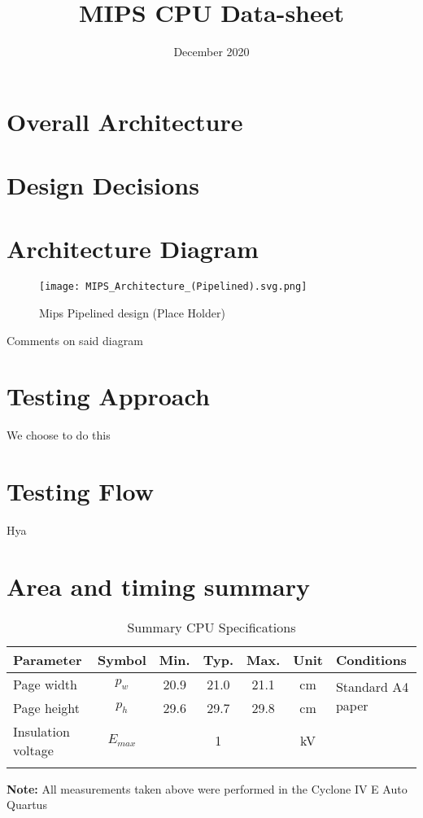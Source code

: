 \documentclass[10pt]{datasheet}
\title{MIPS CPU Data-sheet}
\date{December 2020}
\begin{document}
\maketitle

\section{Overall Architecture}
\smallbreak


\section{Design Decisions}
\smallbreak


\vfill\break

\section{Architecture Diagram}
\smallbreak
\begin{figure}[h]
    \texttt{[image: MIPS\_Architecture\_(Pipelined).svg.png]}
    \captionsetup{justification=centering}
    \caption{Mips Pipelined design (Place Holder)}
\end{figure}

Comments on said diagram


\newpage

\twocolumn

\section{Testing Approach}
\smallbreak
We choose to do this

\vfill\break

\section{Testing Flow}
Hya


\onecolumn

\section{Area and timing summary}
\smallbreak

\begin{table}[h]
\caption{Summary CPU Specifications}
\begin{tabularx}{\textwidth}{l | c | c c c | c | X}
    \thickhline
    \textbf{Parameter} & \textbf{Symbol} & \textbf{Min.} & \textbf{Typ.} & \textbf{Max.} &
    \textbf{Unit} & \textbf{Conditions} \\
    \hline
    Page width  & $p_w$ & 20.9 & 21.0 & 21.1 & cm & \multirow{2}{*}{Standard A4 paper} \\
    Page height & $p_h$ & 29.6 & 29.7 & 29.8 & cm &  \\
    \hline
    Insulation voltage & $E_{max}$\footnotemark[1] & & 1 & & kV & \\
    \thickhline
\end{tabularx}
\end{table}

\textbf{Note:} All measurements taken above were performed in the Cyclone IV E Auto Quartus
\end{document}
